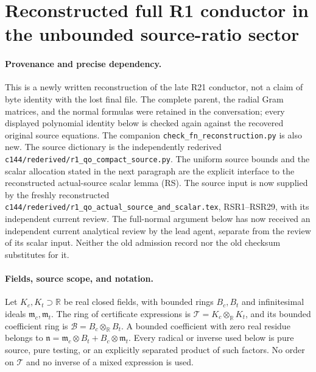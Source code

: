 \section{Reconstructed full R1 conductor in the unbounded source-ratio sector}
\label{sec:fn-reconstructed}

\paragraph{Provenance and precise dependency.}
This is a newly written reconstruction of the late R21 conductor, not a
claim of byte identity with the lost final file.  The complete parent,
the radial Gram matrices, and the normal formulas were retained in the
conversation; every displayed polynomial identity below is checked
again against the recovered original source equations.  The companion
\texttt{check\_fn\_reconstruction.py} is also new.  The source dictionary
is the independently rederived
\texttt{c144/rederived/r1\_qo\_compact\_source.py}.
The uniform source bounds and the scalar allocation stated in the next
paragraph are the explicit interface to the reconstructed actual-source
scalar lemma (RS).  The source input is now supplied by the freshly reconstructed
\texttt{c144/rederived/r1\_qo\_actual\_source\_and\_scalar.tex},
RSR1--RSR29, with its independent current review.  The full-normal
argument below has now received an independent current analytical review
by the lead agent, separate from the review of its scalar input.  Neither
the old admission record nor the old checksum substitutes for it.

\paragraph{Fields, source scope, and notation.}
Let $K_c,K_t\supset\mathbb R$ be real closed fields, with bounded rings
$B_c,B_t$ and infinitesimal ideals $\mathfrak m_c,\mathfrak m_t$.
The ring of certificate expressions is
$\mathcal T=K_c\otimes_{\mathbb R}K_t$, and its bounded coefficient ring
is $\mathcal B=B_c\otimes_{\mathbb R}B_t$.  A bounded coefficient with
zero real residue belongs to
$\mathfrak n=\mathfrak m_c\otimes B_t+B_c\otimes\mathfrak m_t$.
Every radical or inverse used below is pure source, pure testing, or
an explicitly separated product of such factors.  No order on
$\mathcal T$ and no inverse of a mixed expression is used.

